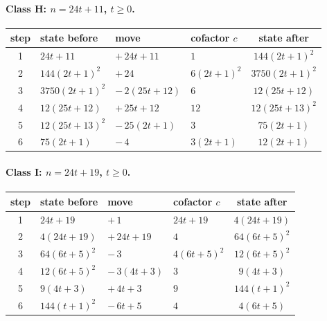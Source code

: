 \paragraph{Class H: $n=24 t + 11$, $t\ge 0$.}
\begin{center}\small\begin{tabular}{@{}clllc@{}}\toprule
step & state before & move & cofactor $c$ & state after\\\midrule
1 & $24 t + 11$ & $+\,24 t + 11$ & $1$ & $144 \left(2 t + 1\right)^{2}$ \\
2 & $144 \left(2 t + 1\right)^{2}$ & $+\,24$ & $6 \left(2 t + 1\right)^{2}$ & $3750 \left(2 t + 1\right)^{2}$ \\
3 & $3750 \left(2 t + 1\right)^{2}$ & $-\,2 \left(25 t + 12\right)$ & $6$ & $12 \left(25 t + 12\right)$ \\
4 & $12 \left(25 t + 12\right)$ & $+\,25 t + 12$ & $12$ & $12 \left(25 t + 13\right)^{2}$ \\
5 & $12 \left(25 t + 13\right)^{2}$ & $-\,25 \left(2 t + 1\right)$ & $3$ & $75 \left(2 t + 1\right)$ \\
6 & $75 \left(2 t + 1\right)$ & $-\,4$ & $3 \left(2 t + 1\right)$ & $12 \left(2 t + 1\right)$ \\
\bottomrule\end{tabular}\end{center}
\paragraph{Class I: $n=24 t + 19$, $t\ge 0$.}
\begin{center}\small\begin{tabular}{@{}clllc@{}}\toprule
step & state before & move & cofactor $c$ & state after\\\midrule
1 & $24 t + 19$ & $+\,1$ & $24 t + 19$ & $4 \left(24 t + 19\right)$ \\
2 & $4 \left(24 t + 19\right)$ & $+\,24 t + 19$ & $4$ & $64 \left(6 t + 5\right)^{2}$ \\
3 & $64 \left(6 t + 5\right)^{2}$ & $-\,3$ & $4 \left(6 t + 5\right)^{2}$ & $12 \left(6 t + 5\right)^{2}$ \\
4 & $12 \left(6 t + 5\right)^{2}$ & $-\,3 \left(4 t + 3\right)$ & $3$ & $9 \left(4 t + 3\right)$ \\
5 & $9 \left(4 t + 3\right)$ & $+\,4 t + 3$ & $9$ & $144 \left(t + 1\right)^{2}$ \\
6 & $144 \left(t + 1\right)^{2}$ & $-\,6 t + 5$ & $4$ & $4 \left(6 t + 5\right)$ \\
\bottomrule\end{tabular}\end{center}
